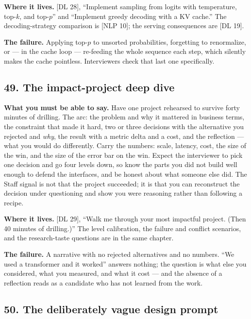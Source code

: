 \textbf{Where it lives.} [DL 28], ``Implement sampling from logits with temperature, top-$k$, and top-$p$'' and ``Implement greedy decoding with a KV cache.'' The decoding-strategy comparison is [NLP 10]; the serving consequences are [DL 19].

\textbf{The failure.} Applying top-$p$ to unsorted probabilities, forgetting to renormalize, or --- in the cache loop --- re-feeding the whole sequence each step, which silently makes the cache pointless. Interviewers check that last one specifically.

\subsection*{49. The impact-project deep dive}

\textbf{What you must be able to say.} Have one project rehearsed to survive forty minutes of drilling. The arc: the problem and why it mattered in business terms, the constraint that made it hard, two or three decisions with the alternative you rejected and \emph{why}, the result with a metric delta and a cost, and the reflection --- what you would do differently. Carry the numbers: scale, latency, cost, the size of the win, and the size of the error bar on the win. Expect the interviewer to pick one decision and go four levels down, so know the parts you did not build well enough to defend the interfaces, and be honest about what someone else did. The Staff signal is not that the project succeeded; it is that you can reconstruct the decision under questioning and show you were reasoning rather than following a recipe.

\textbf{Where it lives.} [DL 29], ``Walk me through your most impactful project. (Then 40 minutes of drilling.)'' The level calibration, the failure and conflict scenarios, and the research-taste questions are in the same chapter.

\textbf{The failure.} A narrative with no rejected alternatives and no numbers. ``We used a transformer and it worked'' answers nothing; the question is what else you considered, what you measured, and what it cost --- and the absence of a reflection reads as a candidate who has not learned from the work.

\subsection*{50. The deliberately vague design prompt}

